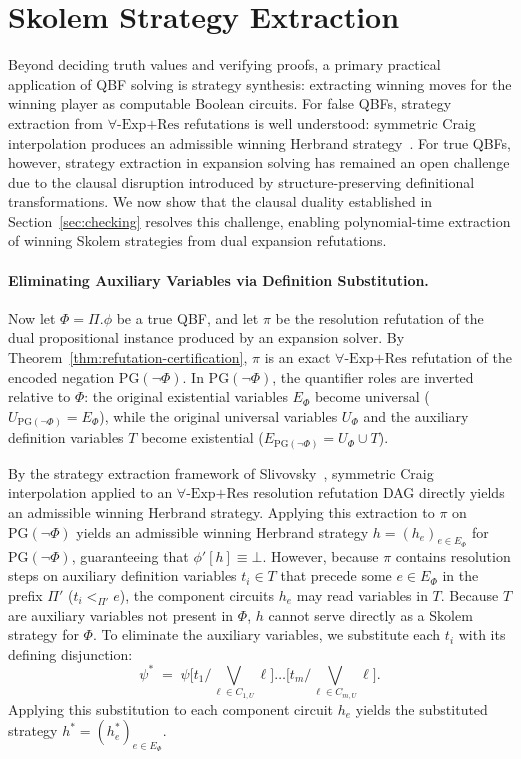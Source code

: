 \documentclass[runningheads]{llncs}
\newcommand{\ExpRes}{\forall\text{-}\mathrm{Exp}\text{+}\mathrm{Res}}
\newcommand{\PG}{\mathrm{PG}}
\begin{document}
\section{Skolem Strategy Extraction}
\label{sec:extraction}

Beyond deciding truth values and verifying proofs, a primary practical application of QBF solving is strategy synthesis: extracting winning moves for the winning player as computable Boolean circuits.
For false QBFs, strategy extraction from $\ExpRes$ refutations is well understood: symmetric Craig interpolation produces an admissible winning Herbrand strategy~\cite{slivovsky2024,schlaipfer2020}.
For true QBFs, however, strategy extraction in expansion solving has remained an open challenge due to the clausal disruption introduced by structure-preserving definitional transformations.
We now show that the clausal duality established in Section~\ref{sec:checking} resolves this challenge, enabling polynomial-time extraction of winning Skolem strategies from dual expansion refutations.

\paragraph*{Eliminating Auxiliary Variables via Definition Substitution.}
Now let $\Phi = \Pi.\phi$ be a true QBF, and let $\pi$ be the resolution refutation of the dual propositional instance produced by an expansion solver.
By Theorem~\ref{thm:refutation-certification}, $\pi$ is an exact $\ExpRes$ refutation of the encoded negation $\PG(\neg\Phi)$.
In $\PG(\neg\Phi)$, the quantifier roles are inverted relative to $\Phi$: the original existential variables $E_\Phi$ become universal ($U_{\PG(\neg\Phi)} = E_\Phi$), while the original universal variables $U_\Phi$ and the auxiliary definition variables $T$ become existential ($E_{\PG(\neg\Phi)} = U_\Phi \cup T$).

By the strategy extraction framework of Slivovsky~\cite{slivovsky2024}, symmetric Craig interpolation applied to an $\ExpRes$ resolution refutation DAG directly yields an admissible winning Herbrand strategy.
Applying this extraction to $\pi$ on $\PG(\neg\Phi)$ yields an admissible winning Herbrand strategy $h = (h_e)_{e \in E_\Phi}$ for $\PG(\neg\Phi)$, guaranteeing that $\phi'[h] \equiv \bot$.
However, because $\pi$ contains resolution steps on auxiliary definition variables $t_i \in T$ that precede some $e \in E_\Phi$ in the prefix $\Pi'$ ($t_i <_{\Pi'} e$), the component circuits $h_e$ may read variables in $T$.
Because $T$ are auxiliary variables not present in $\Phi$, $h$ cannot serve directly as a Skolem strategy for $\Phi$.
To eliminate the auxiliary variables, we substitute each $t_i$ with its defining disjunction:
\begin{equation}
    \label{eq:substitution}
    \psi^* \;=\; \psi\big[t_1 / \textstyle\bigvee_{\ell \in C_{1,U}} \ell\big] \dots \big[t_m / \textstyle\bigvee_{\ell \in C_{m,U}} \ell\big] .
\end{equation}
Applying this substitution to each component circuit $h_e$ yields the substituted strategy $h^* = (h_e^*)_{e \in E_\Phi}$.
\end{document}
